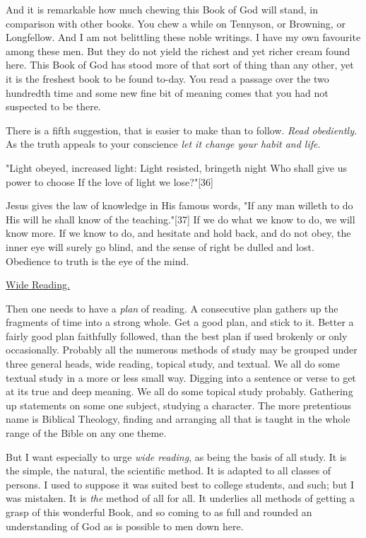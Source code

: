 And it is remarkable how much chewing this Book of God will stand, in
comparison with other books. You chew a while on Tennyson, or Browning, or
Longfellow. And I am not belittling these noble writings. I have my own
favourite among these men. But they do not yield the richest and yet
richer cream found here. This Book of God has stood more of that sort of
thing than any other, yet it is the freshest book to be found to-day. You
read a passage over the two hundredth time and some new fine bit of
meaning comes that you had not suspected to be there.

There is a fifth suggestion, that is easier to make than to follow. \textit{Read
obediently.} As the truth appeals to your conscience \textit{let it change your
habit and life}.

    "Light obeyed, increased light:
    Light resisted, bringeth night
    Who shall give us power to choose
    If the love of light we lose?"[36]

Jesus gives the law of knowledge in His famous words, "If any man willeth
to do His will he shall know of the teaching."[37] If we do what we know
to do, we will know more. If we know to do, and hesitate and hold back,
and do not obey, the inner eye will surely go blind, and the sense of
right be dulled and lost. Obedience to truth is the eye of the mind.



\underline{Wide Reading.}


Then one needs to have a \textit{plan} of reading. A consecutive plan gathers up
the fragments of time into a strong whole. Get a good plan, and stick to
it. Better a fairly good plan faithfully followed, than the best plan if
used brokenly or only occasionally. Probably all the numerous methods of
study may be grouped under three general heads, wide reading, topical
study, and textual. We all do some textual study in a more or less small
way. Digging into a sentence or verse to get at its true and deep meaning.
We all do some topical study probably. Gathering up statements on some one
subject, studying a character. The more pretentious name is Biblical
Theology, finding and arranging all that is taught in the whole range of
the Bible on any one theme.

But I want especially to urge \textit{wide reading}, as being the basis of all
study. It is the simple, the natural, the scientific method. It is adapted
to all classes of persons. I used to suppose it was suited best to college
students, and such; but I was mistaken. It is \textit{the} method of all for all.
It underlies all methods of getting a grasp of this wonderful Book, and so
coming to as full and rounded an understanding of God as is possible to
men down here.

